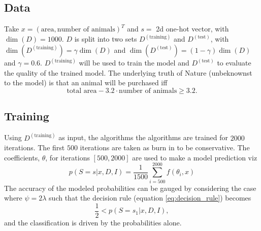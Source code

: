 \documentclass[a4paper,11pt, oneside]{article}
\theoremstyle{definition}
\begin{document}
	
	
	
	\subsection{Data}
	Take $x=(\text{area},\text{number of animals})^T$ and $s=$ 2d one-hot vector, with $\dim(D)=1000$. $D$ is split into two sets $D^{(\text{training})}$ and $D^{(\text{test})}$, with $\dim(D^{(\text{training})})=\gamma\dim(D)$ and $\dim(D^{(\text{test})})=(1-\gamma)\dim(D)$ and $\gamma=0.6$. $D^{(\text{training})}$ will be used to train the model and $D^{(\text{test})}$ to evaluate the quality of the trained model. The underlying truth of Nature (unbeknownst to the model) is that an animal will be purchased iff
	\begin{equation}
		\text{total area}- 3.2\cdot\text{number of animals}\geq 3.2.
		\label{eq:nature}
	\end{equation}
	
	\subsection{Training}
	Using $D^{(\text{training})}$ as input, the algorithms the algorithms are trained for $2000$ iterations. The first $500$ iterations are taken as burn in to be conservative. The coefficients, $\theta$, for iterations $[500,2000]$ are used to make a model prediction viz
	\begin{equation}
		p(S= s|x,D,I)=\frac{1}{1500}\sum_{i=500}^{2000}f(\theta_i,x)
	\end{equation}
	The accuracy of the modeled probabilities can be gauged by considering the case where $\psi=2\lambda$ such that the decision rule (equation \eqref{eq:decision_rule}) becomes
	\begin{equation}
		\frac{1}{2} < p(S= s_1|x,D,I),
		\label{eq:decision_rule2}
	\end{equation}
	and the classification is driven by the probabilities alone. 
	
	
\end{document}
